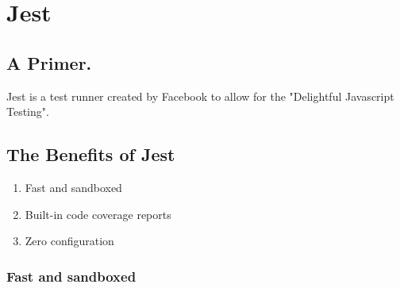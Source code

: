 \maketitle{}
\section{ Jest }

\subsection{ A Primer. }
Jest is a test runner created by Facebook to allow for the "Delightful
Javascript Testing".

\subsection{ The Benefits of Jest }
\begin{enumerate}
  \item Fast and sandboxed
  \item Built-in code coverage reports
  \item Zero configuration
\end{enumerate}

\subsubsection{ Fast and sandboxed }
